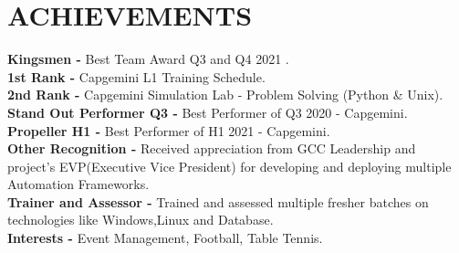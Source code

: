 \documentclass[letterpaper,11pt]{article}
\begin{document}
\section{ACHIEVEMENTS}
 \begin{itemize}[leftmargin=0in, label={}]
    \small{\item{
    \textbf{Kingsmen -} {Best Team Award Q3 and Q4 2021 .} \vspace{2pt} \\
    \textbf{1st Rank -} {Capgemini L1 Training Schedule.} \vspace{2pt} \\
    \textbf{2nd Rank -} {Capgemini Simulation Lab - Problem Solving (Python \& Unix).} \vspace{2pt} \\
    \textbf{Stand Out Performer Q3 -} {Best Performer of Q3 2020 - Capgemini.} \vspace{2pt} \\
    \textbf{Propeller H1 -} {Best Performer of H1 2021 - Capgemini.} \vspace{2pt} \\
    \textbf{Other Recognition -} {Received appreciation from GCC Leadership and project's EVP(Executive Vice President) for developing and deploying multiple Automation Frameworks.} \vspace{2pt} \\
    \textbf{Trainer and Assessor -} {Trained and assessed multiple fresher batches on technologies like Windows,Linux and Database.} \vspace{2pt} \\
    \textbf{Interests -} {Event Management, Football, Table Tennis.} \vspace{2pt} \\
    }
    }
 \end{itemize}
\end{document}
